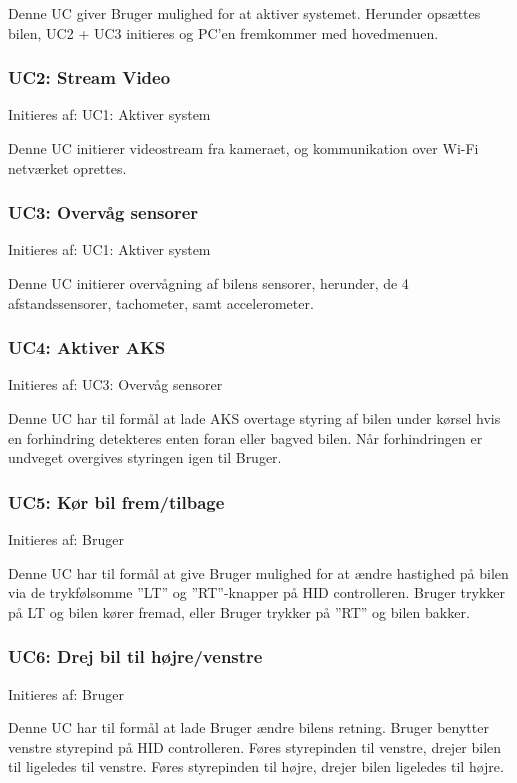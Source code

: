 Denne UC giver Bruger mulighed for at aktiver systemet. Herunder opsættes bilen, UC2 + UC3 initieres og PC'en fremkommer med hovedmenuen. 

\subsubsection{UC2: Stream Video}
Initieres af: UC1: Aktiver system

Denne UC initierer videostream fra kameraet, og kommunikation over Wi-Fi netværket oprettes.

\subsubsection{UC3: Overvåg sensorer}
Initieres af: UC1: Aktiver system

Denne UC initierer overvågning af bilens sensorer, herunder, de 4 afstandssensorer, tachometer, samt accelerometer. 

\subsubsection{UC4: Aktiver AKS}
Initieres af: UC3: Overvåg sensorer

Denne UC har til formål at lade AKS overtage styring af bilen under kørsel hvis en forhindring detekteres enten foran eller bagved bilen.
Når forhindringen er undveget overgives styringen igen til Bruger.

\subsubsection{UC5: Kør bil frem/tilbage}
Initieres af: Bruger

Denne UC har til formål at give Bruger mulighed for at ændre hastighed på bilen via  de trykfølsomme ''LT'' og ''RT''-knapper på HID controlleren. Bruger trykker på LT og bilen kører fremad, eller Bruger trykker på ''RT'' og bilen bakker.

\subsubsection{UC6: Drej bil til højre/venstre}
Initieres af: Bruger

Denne UC har til formål at lade Bruger ændre bilens retning. Bruger benytter venstre styrepind på HID controlleren. Føres styrepinden til venstre, drejer bilen til ligeledes til venstre. Føres styrepinden til højre, drejer bilen ligeledes til højre. 

